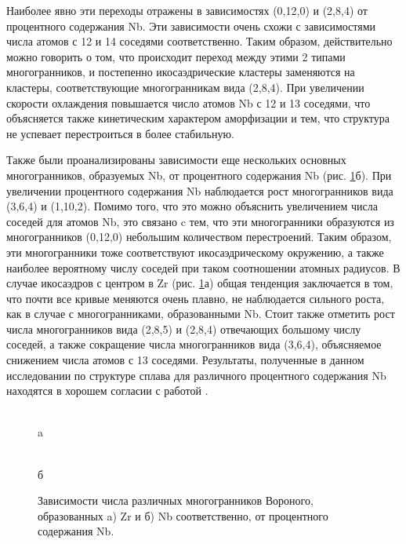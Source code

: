 Наиболее явно эти переходы отражены в зависимостях (0,12,0) и (2,8,4) от процентного содержания Nb. Эти зависимости очень схожи с зависимостями числа атомов с 12 и 14 соседями соответственно. 
Таким образом, действительно можно говорить о том, что происходит переход между этими 2 типами многогранников, и постепенно икосаэдрические кластеры заменяются на кластеры, соответствующие многогранникам вида (2,8,4). При увеличении скорости охлаждения повышается число атомов Nb с 12 и 13 соседями, что объясняется также кинетическим характером аморфизации и тем, что структура не успевает перестроиться в более стабильную. 

Также были проанализированы зависимости еще нескольких основных многогранников, образуемых Nb, от процентного содержания Nb (рис. \ref{polyhedra_Zr_Nb}б). При увеличении процентного содержания Nb наблюдается рост многогранников вида (3,6,4) и (1,10,2). Помимо того, что это можно объяснить увеличением числа соседей для атомов Nb, это связано c тем, что эти многогранники образуются из многогранников (0,12,0) небольшим количеством перестроений. Таким образом, эти многогранники тоже соответствуют икосаэдрическому окружению, а также наиболее вероятному числу соседей при таком соотношении атомных радиусов. В случае икосаэдров с центром в Zr (рис. \ref{polyhedra_Zr_Nb}а) общая тенденция заключается в том, что почти все кривые меняются очень плавно, не наблюдается сильного роста, как в случае с многогранниками, образованными Nb. Стоит также отметить рост числа многогранников вида (2,8,5) и (2,8,4) отвечающих большому числу соседей, а также сокращение числа многогранников вида (3,6,4), объясняемое снижением числа атомов с 13 соседями. Результаты, полученные в данном исследовании по структуре сплава для различного процентного содержания Nb находятся в хорошем согласии с работой \cite{Reddy}.
\begin{figure}[h!]
	\begin{center}
		\begin{minipage}[h]{0.7\linewidth}
			 \\a 
		\end{minipage}
		\hfill
		\begin{minipage}[h]{0.7\linewidth}
			 \\б
		\end{minipage}
		\caption{Зависимости числа различных многогранников Вороного, образованных  a) Zr и б) Nb соответственно, от процентного содержания Nb.}
		\label{polyhedra_Zr_Nb}
	\end{center}
\end{figure}

